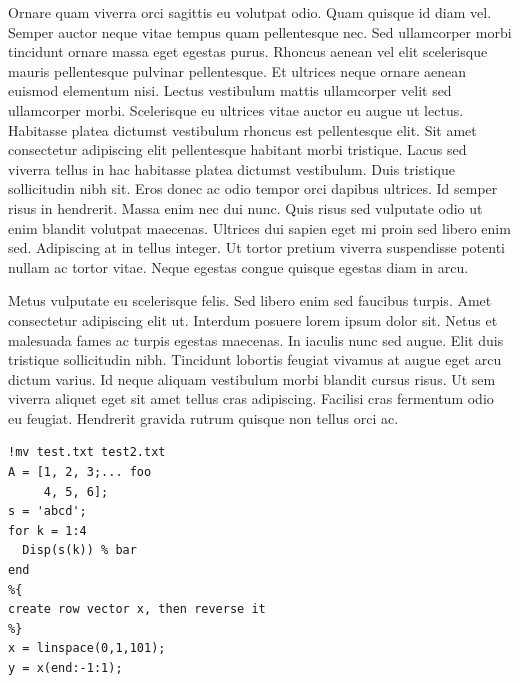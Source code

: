 \documentclass[portuguese, 11pt, a4paper,titlepage, oneside]{article}
\begin{document}
Ornare quam viverra orci sagittis eu volutpat odio. Quam quisque id diam vel. Semper auctor neque vitae tempus quam pellentesque nec. Sed ullamcorper morbi tincidunt ornare massa eget egestas purus. Rhoncus aenean vel elit scelerisque mauris pellentesque pulvinar pellentesque. Et ultrices neque ornare aenean euismod elementum nisi. Lectus vestibulum mattis ullamcorper velit sed ullamcorper morbi. Scelerisque eu ultrices vitae auctor eu augue ut lectus. Habitasse platea dictumst vestibulum rhoncus est pellentesque elit. Sit amet consectetur adipiscing elit pellentesque habitant morbi tristique. Lacus sed viverra tellus in hac habitasse platea dictumst vestibulum. Duis tristique sollicitudin nibh sit. Eros donec ac odio tempor orci dapibus ultrices. Id semper risus in hendrerit. Massa enim nec dui nunc. Quis risus sed vulputate odio ut enim blandit volutpat maecenas. Ultrices dui sapien eget mi proin sed libero enim sed. Adipiscing at in tellus integer. Ut tortor pretium viverra suspendisse potenti nullam ac tortor vitae. Neque egestas congue quisque egestas diam in arcu.

Metus vulputate eu scelerisque felis. Sed libero enim sed faucibus turpis. Amet consectetur adipiscing elit ut. Interdum posuere lorem ipsum dolor sit. Netus et malesuada fames ac turpis egestas maecenas. In iaculis nunc sed augue. Elit duis tristique sollicitudin nibh. Tincidunt lobortis feugiat vivamus at augue eget arcu dictum varius. Id neque aliquam vestibulum morbi blandit cursus risus. Ut sem viverra aliquet eget sit amet tellus cras adipiscing. Facilisi cras fermentum odio eu feugiat. Hendrerit gravida rutrum quisque non tellus orci ac.

\begin{lstlisting}[style=Matlab-editor]
%% Sample Matlab code
!mv test.txt test2.txt
A = [1, 2, 3;... foo
     4, 5, 6];
s = 'abcd';
for k = 1:4
  Disp(s(k)) % bar
end
%{
create row vector x, then reverse it
%}
x = linspace(0,1,101);
y = x(end:-1:1);
\end{lstlisting}
\end{document}

